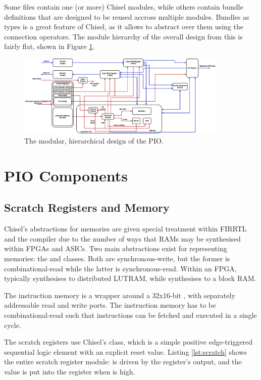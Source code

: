 Some files contain one (or more) Chisel modules, while others contain bundle definitions that are designed to be reused accross multiple modules. Bundles as types is a great feature of Chisel, as it allows to abstract over them using the connection operators. The module hierarchy of the overall design from this is fairly flat, shown in Figure \ref{fig:hdl_hierarchy}.

\begin{figure}[H]
    \centering
    \includegraphics[width=0.9\textwidth]{../img/bd.png}
    \caption{The modular, hierarchical design of the PIO.}
    \label{fig:hdl_hierarchy}
\end{figure}

\section{PIO Components}

\subsection{Scratch Registers and Memory}

Chisel's abstractions for memories are given special treatment within FIRRTL and the compiler due to the number of ways that RAMs may be synthesised within FPGAs and ASICs. Two main abstractions exist for representing memories: the  and  classes. Both are synchronous-write, but the former is combinational-read while the latter is synchronous-read. Within an FPGA,  typically synthesises to distributed LUTRAM, while  synthesises to a block RAM.

The instruction memory is a wrapper around a 32x16-bit , with separately addressable read and write ports. The instruction memory has to be combinational-read such that instructions can be fetched and executed in a single cycle.

The scratch registers use Chisel's  class, which is a simple positive edge-triggered sequential logic element with an explicit reset value. Listing \ref{lst:scratch} shows the entire scratch register module:  is driven by the register's output, and the  value is put into the register when  is high.

